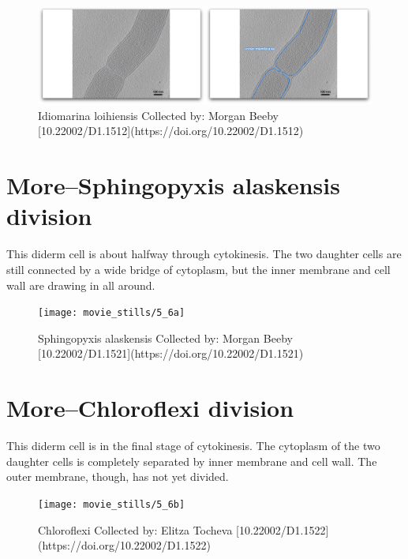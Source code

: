 \documentclass[]{tufte-book}
\begin{document}
\begin{figure}
\includegraphics{movie_stills/5_6} \caption[Idiomarina loihiensis Collected by]{Idiomarina loihiensis Collected by: Morgan Beeby [10.22002/D1.1512](https://doi.org/10.22002/D1.1512)}\label{fig:unnamed-chunk-87}
\end{figure}

\hypertarget{moresphingopyxis-alaskensis-division}{\section{More--Sphingopyxis
alaskensis division}\label{moresphingopyxis-alaskensis-division}}

This diderm cell is about halfway through cytokinesis. The two daughter
cells are still connected by a wide bridge of cytoplasm, but the inner
membrane and cell wall are drawing in all around.

\begin{figure}
\texttt{[image: movie\_stills/5\_6a]} \caption[Sphingopyxis alaskensis Collected by]{Sphingopyxis alaskensis Collected by: Morgan Beeby [10.22002/D1.1521](https://doi.org/10.22002/D1.1521)}\label{fig:unnamed-chunk-88}
\end{figure}

\hypertarget{morechloroflexi-division}{\section{More--Chloroflexi
division}\label{morechloroflexi-division}}

This diderm cell is in the final stage of cytokinesis. The cytoplasm of
the two daughter cells is completely separated by inner membrane and
cell wall. The outer membrane, though, has not yet divided.

\begin{figure}
\texttt{[image: movie\_stills/5\_6b]} \caption[Chloroflexi Collected by]{Chloroflexi Collected by: Elitza Tocheva [10.22002/D1.1522](https://doi.org/10.22002/D1.1522)}\label{fig:unnamed-chunk-89}
\end{figure}
\end{document}

